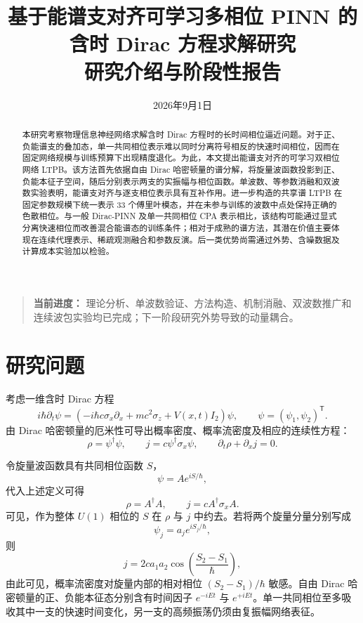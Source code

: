 \documentclass[UTF8,a4paper,12pt,fontset=fandol]{ctexart}
\title{基于能谱支对齐可学习多相位 PINN 的含时 Dirac 方程求解研究\\
\large 研究介绍与阶段性报告}
\author{}
\date{2026年9月1日}
\begin{document}
\maketitle

\begin{quote}
\noindent\textbf{当前进度：}
理论分析、单波数验证、方法构造、机制消融、双波数推广和连续波包实验均已完成；下一阶段研究外势导致的动量耦合。
\end{quote}

\begin{abstract}
本研究考察物理信息神经网络求解含时 Dirac 方程时的长时间相位逼近问题。对于正、负能谱支的叠加态，单一共同相位表示难以同时分离符号相反的快速时间相位，因而在固定网络规模与训练预算下出现精度退化。为此，本文提出能谱支对齐的可学习双相位网络 LTPB。该方法首先依据自由 Dirac 哈密顿量的谱分解，将旋量波函数投影到正、负能本征子空间，随后分别表示两支的实振幅与相位函数。单波数、等参数消融和双波数实验表明，能谱支对齐与逐支相位表示具有互补作用。进一步构造的共享谱 LTPB 在固定参数规模下统一表示 33 个傅里叶模态，并在未参与训练的波数中点处保持正确的色散相位。与一般 Dirac-PINN 及单一共同相位 CPA 表示相比，该结构可能通过显式分离快速相位而改善混合能谱态的训练条件；相对于成熟的谱方法，其潜在价值主要体现在连续代理表示、稀疏观测融合和参数反演。后一类优势尚需通过外势、含噪数据及计算成本实验加以检验。
\end{abstract}

\section{研究问题}

考虑一维含时 Dirac 方程
\begin{equation}
i\hbar\partial_t\psi=
\left(-i\hbar c\sigma_x\partial_x+mc^2\sigma_z+V(x,t)I_2\right)\psi,
\qquad
\psi=(\psi_1,\psi_2)^{\mathsf T}.
\end{equation}
由 Dirac 哈密顿量的厄米性可导出概率密度、概率流密度及相应的连续性方程：
\begin{equation}
\rho=\psi^\dagger\psi,
\qquad
j=c\psi^\dagger\sigma_x\psi,
\qquad
\partial_t\rho+\partial_xj=0.
\end{equation}

令旋量波函数具有共同相位函数 $S$，
\begin{equation}
\psi=Ae^{iS/\hbar},
\end{equation}
代入上述定义可得
\begin{equation}
\rho=A^\dagger A,
\qquad
j=cA^\dagger\sigma_xA.
\end{equation}
可见，作为整体 $U(1)$ 相位的 $S$ 在 $\rho$ 与 $j$ 中约去。若将两个旋量分量分别写成
\begin{equation}
\psi_j=a_je^{iS_j/\hbar},
\end{equation}
则
\begin{equation}
j=2ca_1a_2\cos\!\left(\frac{S_2-S_1}{\hbar}\right),
\end{equation}
由此可见，概率流密度对旋量内部的相对相位 $(S_2-S_1)/\hbar$ 敏感。自由 Dirac 哈密顿量的正、负能本征态分别含有时间因子 $e^{-iEt}$ 与 $e^{+iEt}$。单一共同相位至多吸收其中一支的快速时间变化，另一支的高频振荡仍须由复振幅网络表征。
\end{document}
